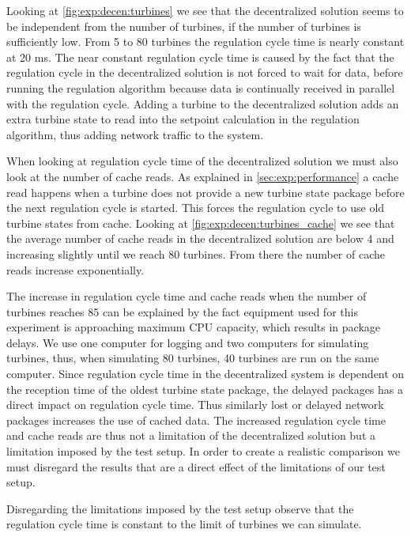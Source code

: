 Looking at \cref{fig:exp:decen:turbines} we see that the decentralized solution seems to be independent from the number of turbines, if the number of turbines is sufficiently low.
From 5 to 80 turbines the regulation cycle time is nearly constant at 20 ms.
The near constant regulation cycle time is caused by the fact that the regulation cycle in the decentralized solution is not forced to wait for data, before running the regulation algorithm because data is continually received in parallel with the regulation cycle. Adding a turbine to the decentralized solution adds an extra turbine state to read into the setpoint calculation in the regulation algorithm, thus adding network traffic to the system. 

When looking at regulation cycle time of the decentralized solution we must also look at the number of cache reads.
As explained in \cref{sec:exp:performance} a cache read happens when a turbine does not provide a new turbine state package before the next regulation cycle is started.
This forces the regulation cycle to use old turbine states from cache.
Looking at \cref{fig:exp:decen:turbines_cache} we see that the average number of cache reads in the decentralized solution are below 4 and increasing slightly until we reach 80 turbines. From there the number of cache reads increase exponentially.

The increase in regulation cycle time and cache reads when the number of turbines reaches 85 can be explained by the fact equipment used for this experiment is approaching maximum CPU capacity, which results in package delays. We use one computer for logging and two computers for simulating turbines, thus, when simulating 80 turbines, 40 turbines are run on the same computer.
Since regulation cycle time in the decentralized system is dependent on the reception time of the oldest turbine state package, the delayed packages has a direct impact on regulation cycle time.
Thus similarly lost or delayed network packages increases the use of cached data. The increased regulation cycle time and cache reads are thus not a limitation of the decentralized solution but a limitation imposed by the test setup. In order to create a realistic comparison we must disregard the results that are a direct effect of the limitations of our test setup.

Disregarding the limitations imposed by the test setup observe that the regulation cycle time is constant to the limit of turbines we can simulate. 

